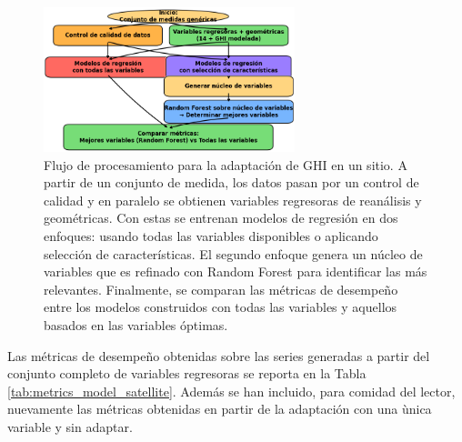 \begin{figure}
    \centering
    \includegraphics[width=0.65\textwidth]{figuras/procedure_1.png}
    \caption{Flujo de procesamiento para la adaptación de GHI en un sitio. A partir de un conjunto de medida, los datos pasan por un control de calidad y en paralelo se obtienen variables regresoras de reanálisis y geométricas. Con estas se entrenan modelos de regresión en dos enfoques: usando todas las variables disponibles o aplicando selección de características. El segundo enfoque genera un núcleo de variables que es refinado con Random Forest para identificar las más relevantes. Finalmente, se comparan las métricas de desempeño entre los modelos construidos con todas las variables y aquellos basados en las variables óptimas.}
    \label{fig:procedureSA01}
\end{figure}



Las métricas de desempeño obtenidas sobre las series generadas a partir del conjunto completo de variables regresoras se reporta en la Tabla \ref{tab:metrics_model_satellite}. Además se han incluido, para comidad del lector, nuevamente las métricas obtenidas en partir de la adaptación con una ùnica variable y sin adaptar.


